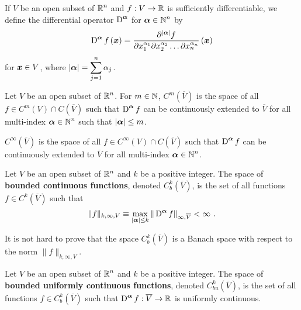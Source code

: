 If $V$ be an open subset of $\displaystyle \mathbb{R}^n$ and $f:V \to \mathbb{R}$ is
sufficiently differentiable, we define the differential operator
$\displaystyle \operatorname{D}^{{\bm{\alpha}}}$ for $\displaystyle {\bm{\alpha}} \in \mathbb{N}^n$
by
\[
\operatorname{D}^{{\bm{\alpha}}} f\left({\bm{x}}\right)
= \frac{\partial^{|{\bm{\alpha}}|} f}{\partial x_1^{\alpha_1}
\partial x_2^{\alpha_2} \ldots \partial x_n^{\alpha_n}}\left({\bm{x}}\right)
\]
for ${\bm{x}} \in V$, where
$\displaystyle |{\bm{\alpha}}| = \sum_{j=1}^n \alpha_j$.

\begin{defn*}
Let $V$ be an open subset of $\displaystyle \mathbb{R}^n$.  For $m\in \mathbb{N}$,
$\displaystyle C^m(\overline{V})$ is the space of all
$\displaystyle f \in C^m(V) \cap C(\overline{V})$ such that
$\displaystyle \operatorname{D}^{{\bm{\alpha}}} f$ can be continuously extended
to $\overline{V}$ for
all multi-index $\displaystyle {\bm{\alpha}} \in \mathbb{N}^n$ such that
$|{\bm{\alpha}}|\leq m$.

$\displaystyle C^\infty(\overline{V})$ is the space of all
$\displaystyle f \in C^\infty(V) \cap C(\overline{V})$ such that
$\displaystyle \operatorname{D}^{{\bm{\alpha}}} f$ can be continuously extended to
$\overline{V}$ for all multi-index $\displaystyle {\bm{\alpha}} \in \mathbb{N}^n$.
\end{defn*}

\begin{defn*}
Let $V$ be an open subset of $\displaystyle \mathbb{R}^n$ and $k$ be a
positive integer.  The space of {\bfseries bounded continuous
functions}, denoted
$\displaystyle C_b^k(\overline{V})$, is the set of all functions
$\displaystyle f\in C^k\left(\overline{V}\right)$ such that
\[
\|f\|_{k,\infty,V} \equiv \max_{|\VEC{\alpha}|\leq k}
\|\diff^{\VEC{\alpha}} f\|_{\infty,\overline{V}} < \infty \ .
\]
\end{defn*}

It is not hard to prove that the space
$\displaystyle C^k_b(\overline{V})$ is a Banach space
with respect to the norm $\displaystyle \|f\|_{k,\infty,V}$.

\begin{defn*}
Let $V$ be an open subset of $\displaystyle \mathbb{R}^n$ and $k$ be a
positive integer.  The space of {\bfseries bounded uniformly continuous
functions}, denoted
$\displaystyle C_{bu}^k(\overline{V})$, is the set of all functions
$\displaystyle f\in C_b^k\left(\overline{V}\right)$ such that
$\displaystyle \operatorname{D}^{{\bm{\alpha}}} f:\overline{V} \to \mathbb{R}$ is uniformly
continuous.
\end{defn*}

